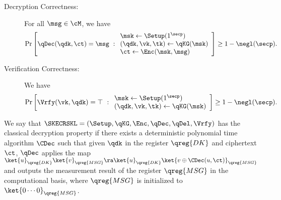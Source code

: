 \begin{definition}
\begin{description}
\item[Decryption Correctness:] For all $\msg \in \cM$, we have
\begin{align}
\Pr\left[
\qDec(\qdk, \ct) \allowbreak = \msg
\ :
\begin{array}{ll}
\msk\gets\Setup(1^\secp)\\
(\qdk,\vk,\tk)\gets\qKG(\msk)\\
\ct\gets\Enc(\msk,\msg)
\end{array}
\right] 
\ge 1-\negl(\secp).
\end{align}

\item[Verification Correctness:] We have 
\begin{align}
\Pr\left[
\Vrfy(\vk,\qdk)=\top
\ :
\begin{array}{ll}
\msk\gets\Setup(1^\secp)\\
(\qdk,\vk,\tk)\gets\qKG(\msk)\\
\end{array}
\right] 
\ge 1-\negl(\secp).
\end{align}


\end{description}
\end{definition}


\begin{definition}
We say that $\SKECRSKL=(\Setup,\qKG,\Enc,\qDec,\qDel, \Vrfy)$ has
the classical decryption property if there exists a deterministic
polynomial time algorithm $\CDec$ such that given $\qdk$ in the
register $\qreg{DK}$ and ciphertext $\ct$, $\qDec$ applies the map
$\ket{u}_{\qreg{DK}}\ket{v}_{\qreg{MSG}}\ra\ket{u}_{\qreg{DK}}\ket{v\oplus\CDec(u,\ct)}_{\qreg{MSG}}$
and outputs the measurement result of the register $\qreg{MSG}$ in
the computational basis, where $\qreg{MSG}$ is initialized to
$\ket{0\cdots0}_{\qreg{MSG}}$.  \end{definition}

